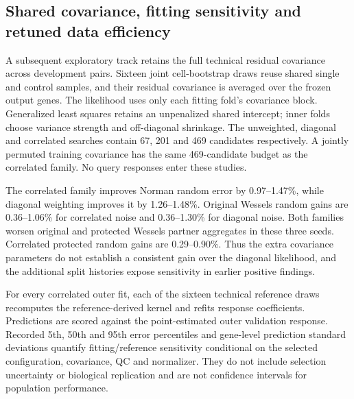 \subsection{Shared covariance, fitting sensitivity and retuned data efficiency}
A subsequent exploratory track retains the full technical residual covariance across development pairs. Sixteen joint cell-bootstrap draws reuse shared single and control samples, and their residual covariance is averaged over the frozen output genes. The likelihood uses only each fitting fold's covariance block. Generalized least squares retains an unpenalized shared intercept; inner folds choose variance strength and off-diagonal shrinkage. The unweighted, diagonal and correlated searches contain 67, 201 and 469 candidates respectively. A jointly permuted training covariance has the same 469-candidate budget as the correlated family. No query responses enter these studies.

\begin{table}[htbp]\centering\normalsize\caption{Percentage MSE reduction relative to the unweighted kernel over three additional development split seeds. Ranges are extrema of dependent resamplings, not confidence intervals. Negative reductions indicate worse error.}\end{table}

The correlated family improves Norman random error by 0.97--1.47\%, while diagonal weighting improves it by 1.26--1.48\%. Original Wessels random gains are 0.36--1.06\% for correlated noise and 0.36--1.30\% for diagonal noise. Both families worsen original and protected Wessels partner aggregates in these three seeds. Correlated protected random gains are 0.29--0.90\%. Thus the extra covariance parameters do not establish a consistent gain over the diagonal likelihood, and the additional split histories expose sensitivity in earlier positive findings.

For every correlated outer fit, each of the sixteen technical reference draws recomputes the reference-derived kernel and refits response coefficients. Predictions are scored against the point-estimated outer validation response. Recorded 5th, 50th and 95th error percentiles and gene-level prediction standard deviations quantify fitting/reference sensitivity conditional on the selected configuration, covariance, QC and normalizer. They do not include selection uncertainty or biological replication and are not confidence intervals for population performance.

